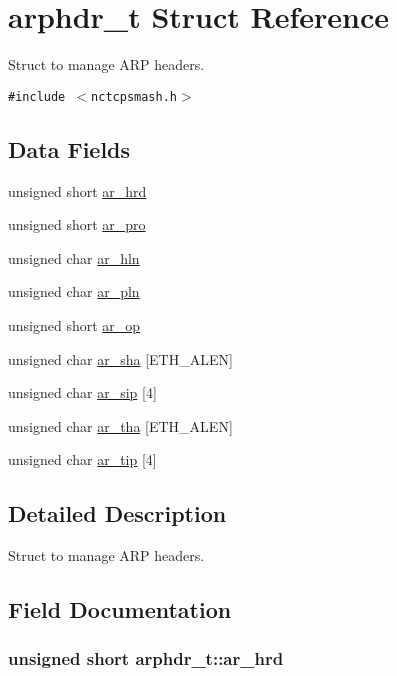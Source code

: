 \hypertarget{structarphdr__t}{
\section{arphdr\_\-t Struct Reference}
\label{structarphdr__t}
}
Struct to manage ARP headers.  


{\tt \#include $<$nctcpsmash.h$>$}

\subsection*{Data Fields}
\begin{CompactItemize}
\item 
unsigned short \hyperlink{structarphdr__t_6a0397aa111b1d7aa391f819a4240ec3}{ar\_\-hrd}
\item 
unsigned short \hyperlink{structarphdr__t_19ad78d51db8ab6940c913769f8afe81}{ar\_\-pro}
\item 
unsigned char \hyperlink{structarphdr__t_c419667b3f5ced7d4d869b808b179098}{ar\_\-hln}
\item 
unsigned char \hyperlink{structarphdr__t_8dec655d6e9394618aeccad297ae619e}{ar\_\-pln}
\item 
unsigned short \hyperlink{structarphdr__t_6a409eda40f585b73b8bed3f68709653}{ar\_\-op}
\item 
unsigned char \hyperlink{structarphdr__t_643425280b72c91dcb44834c281e5286}{ar\_\-sha} \mbox{[}ETH\_\-ALEN\mbox{]}
\item 
unsigned char \hyperlink{structarphdr__t_09417c9e01dfc51910916695bac5b48b}{ar\_\-sip} \mbox{[}4\mbox{]}
\item 
unsigned char \hyperlink{structarphdr__t_03ae5c4ed9bdd8cc59930d4333c16ae1}{ar\_\-tha} \mbox{[}ETH\_\-ALEN\mbox{]}
\item 
unsigned char \hyperlink{structarphdr__t_4fcd057f375589d942fe53303927c6e7}{ar\_\-tip} \mbox{[}4\mbox{]}
\end{CompactItemize}


\subsection{Detailed Description}
Struct to manage ARP headers. 

\subsection{Field Documentation}
\hypertarget{structarphdr__t_6a0397aa111b1d7aa391f819a4240ec3}{
\subsubsection{\setlength{\rightskip}{0pt plus 5cm}unsigned short {\bf arphdr\_\-t::ar\_\-hrd}}}
\label{structarphdr__t_6a0397aa111b1d7aa391f819a4240ec3}


